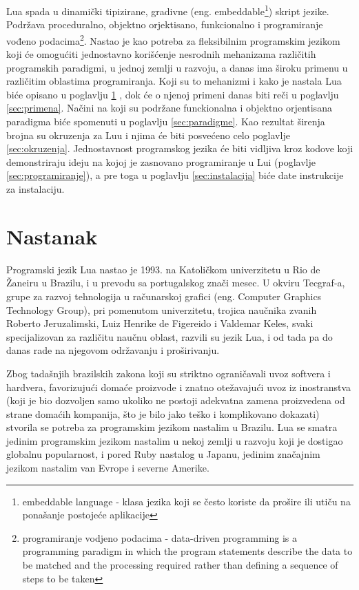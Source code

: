 \documentclass[a4paper]{article}
\begin{document}
 Lua spada u dinamički tipizirane, gradivne (eng. embeddable\footnote{embeddable language - klasa jezika koji se često koriste da prošire ili utiču na ponašanje postojeće aplikacije}) skript jezike. Podržava proceduralno, objektno orjektisano, funkcionalno i programiranje vođeno podacima\footnote{programiranje vodjeno podacima - data-driven programming is a programming paradigm in which the program statements describe the data to be matched and the processing required rather than defining a sequence of steps to be taken}.
Nastao je kao potreba za fleksibilnim programskim jezikom koji će omogućiti jednostavno korišćenje nesrodnih mehanizama različitih programskih paradigmi, u jednoj zemlji u razvoju, a danas ima široku primenu u različitim oblastima programiranja. Koji su to mehanizmi i kako je nastala Lua biće opisano u poglavlju \ref{sec:nastanak} , dok će o njenoj primeni danas biti reči u poglavlju \ref{sec:primena}. Načini na koji su podržane funckionalna i objektno orjentisana paradigma biće spomenuti u poglavlju \ref{sec:paradigme}. Kao rezultat širenja brojna su okruzenja za Luu i njima će biti posvećeno celo poglavlje \ref{sec:okruzenja}. Jednostavnost programskog jezika će biti vidljiva kroz kodove koji demonstriraju ideju na kojoj je zasnovano programiranje u Lui (poglavlje \ref{sec:programiranje}), a pre toga u poglavlju \ref{sec:instalacija} biće date instrukcije za instalaciju.

\section{Nastanak}
\label{sec:nastanak}


Programski jezik Lua nastao je 1993. na Katoličkom univerzitetu u Rio de Žaneiru u Brazilu, i u prevodu sa portugalskog znači mesec. U okviru Tecgraf-a, grupe za razvoj tehnologija u računarskoj grafici (eng. Computer Graphics Technology Group), pri pomenutom univerzitetu, trojica naučnika zvanih Roberto Jeruzalimski, Luiz Henrike de Figereido i Valdemar Keles, svaki specijalizovan za različitu naučnu oblast, razvili su jezik Lua, i od tada pa do danas rade na njegovom održavanju i proširivanju.

Zbog tadašnjih brazilskih zakona koji su striktno ograničavali uvoz softvera i hardvera, favorizujući domaće proizvode i znatno otežavajući uvoz iz inostranstva (koji je bio dozvoljen samo ukoliko ne postoji adekvatna zamena proizvedena od strane domaćih kompanija, što je bilo jako teško i komplikovano dokazati) stvorila se potreba za programskim jezikom nastalim u Brazilu. Lua se smatra jedinim programskim jezikom nastalim u nekoj zemlji u razvoju koji je dostigao globalnu popularnost, i pored Ruby nastalog u Japanu, jedinim značajnim jezikom nastalim van Evrope i severne Amerike.
\end{document}
